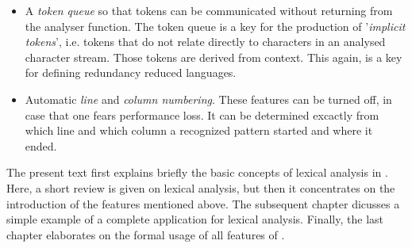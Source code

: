 \begin{itemize}
\item A {\it token queue} so that tokens can be communicated without returning
  from the analyser function.  The token queue is a key for the production of
  '{\it implicit tokens}', i.e.  tokens that do not relate directly to
  characters in an analysed character stream. Those tokens are derived from
  context. This again, is a key for defining redundancy reduced languages.
  
\item Automatic {\it line} and {\it column numbering}. These features can be
  turned off, in case that one fears performance loss. It can be determined
  excactly from which line and which column a recognized pattern started and
  where it ended.

\end{itemize}

The present text first explains briefly the basic concepts of lexical analysis
in {\quex}. Here, a short review is given on lexical analysis, but then it
concentrates on the introduction of the features mentioned above. The
subsequent chapter dicusses a simple example of a complete application for
lexical analysis. Finally, the last chapter elaborates on the formal usage of
all features of {\quex}. 









